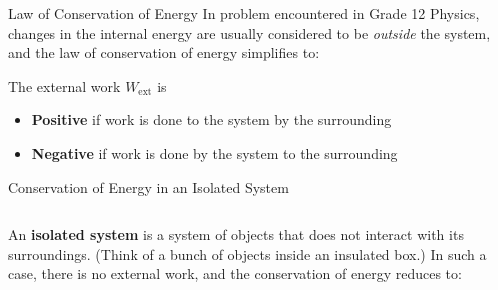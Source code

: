 \documentclass[12pt,compress,aspectratio=169]{beamer}
\begin{document}
\begin{frame}{Law of Conservation of Energy}
  In problem encountered in Grade 12 Physics, changes in the internal energy
  are usually considered to be \emph{outside} the system, and the law of
  conservation of energy simplifies to:
  

  The external work $W_\text{ext}$ is
  \begin{itemize}
  \item\textbf{Positive} if work is done {\color{red}to} the system by the
    surrounding
  \item\textbf{Negative} if work is done {\color{red}by} the system to the
    surrounding
  \end{itemize}
\end{frame}



\begin{frame}{Conservation of Energy in an Isolated System}
  \begin{columns}
    \centering

    An \textbf{isolated system} is a system of objects that does not interact
    with its surroundings. (Think of a bunch of objects inside an insulated
    box.) In such a case, there is no external work, and the conservation of
    energy reduces to:

  \end{columns}
\end{frame}




\end{document}
